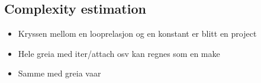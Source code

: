 \subsection{Complexity estimation}
\begin{itemize}
  \item Kryssen mellom en looprelasjon og en konstant er blitt en project 
  \item Hele greia med iter/attach osv kan regnes som en make
  \item Samme med greia vaar
\end{itemize}

